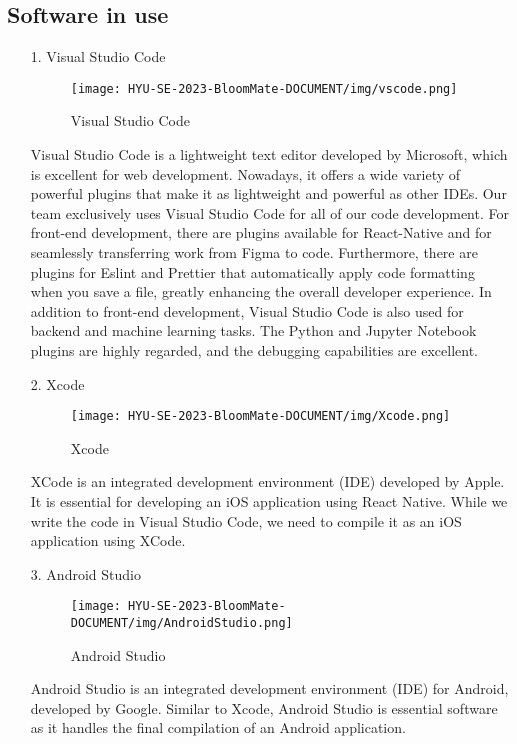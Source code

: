\documentclass[conference, a4paper]{IEEEtran}
\begin{document}
\subsection{Software in use}
\begin{enumerate}
    \item[1.]Visual Studio Code
    \begin{figure}[h]
    \centering
    \texttt{[image: HYU-SE-2023-BloomMate-DOCUMENT/img/vscode.png]}
    \label{fig:VScode}
    \caption{Visual Studio Code} 
    \end{figure}
    \item[]Visual Studio Code is a lightweight text editor developed by Microsoft, which is excellent for web development. Nowadays, it offers a wide variety of powerful plugins that make it as lightweight and powerful as other IDEs. Our team exclusively uses Visual Studio Code for all of our code development. For front-end development, there are plugins available for React-Native and for seamlessly transferring work from Figma to code. Furthermore, there are plugins for Eslint and Prettier that automatically apply code formatting when you save a file, greatly enhancing the overall developer experience. In addition to front-end development, Visual Studio Code is also used for backend and machine learning tasks. The Python and Jupyter Notebook plugins are highly regarded, and the debugging capabilities are excellent.\\
  

    \item[2.]Xcode
    \begin{figure}[h]
    \centering
    \texttt{[image: HYU-SE-2023-BloomMate-DOCUMENT/img/Xcode.png]}
    \label{fig:Xcode}
    \caption{Xcode} 
    \end{figure}
    \item[]XCode is an integrated development environment (IDE) developed by Apple. It is essential for developing an iOS application using React Native. While we write the code in Visual Studio Code, we need to compile it as an iOS application using XCode.\\


    \item[3.]Android Studio
    \begin{figure}[h]
    \centering
    \texttt{[image: HYU-SE-2023-BloomMate-DOCUMENT/img/AndroidStudio.png]}
    \label{fig:AndroidStudio}
    \caption{Android Studio} 
    \end{figure}
    \item[]Android Studio is an integrated development environment (IDE) for Android, developed by Google. Similar to Xcode, Android Studio is essential software as it handles the final compilation of an Android application.\\
\newpage
    

\end{enumerate}
\end{document}
